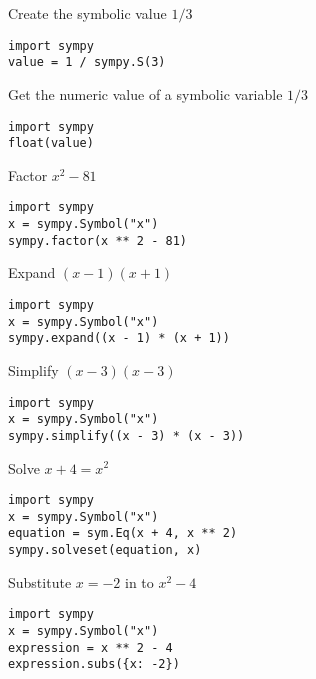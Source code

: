 \documentclass{article}
\begin{document}
\begin{multicols}{2}
        Create the symbolic value $1 / 3$

        \begin{verbatim}
import sympy
value = 1 / sympy.S(3)
        \end{verbatim}

        Get the numeric value of a symbolic variable $1 / 3$

        \begin{verbatim}
import sympy
float(value)
        \end{verbatim}

        Factor $x ^ 2 - 81$

        \begin{verbatim}
import sympy
x = sympy.Symbol("x")
sympy.factor(x ** 2 - 81)
        \end{verbatim}

        Expand $(x - 1) (x + 1)$

        \begin{verbatim}
import sympy
x = sympy.Symbol("x")
sympy.expand((x - 1) * (x + 1))
        \end{verbatim}

        Simplify $(x - 3) (x - 3)$

        \begin{verbatim}
import sympy
x = sympy.Symbol("x")
sympy.simplify((x - 3) * (x - 3))
        \end{verbatim}

        Solve $x + 4 = x ^ 2$

        \begin{verbatim}
import sympy
x = sympy.Symbol("x")
equation = sym.Eq(x + 4, x ** 2)
sympy.solveset(equation, x)
        \end{verbatim}

        Substitute $x=-2$ in to $x ^ 2 - 4$
        
        \begin{verbatim}
import sympy
x = sympy.Symbol("x")
expression = x ** 2 - 4
expression.subs({x: -2})
        \end{verbatim}
\end{multicols}
\end{document}
